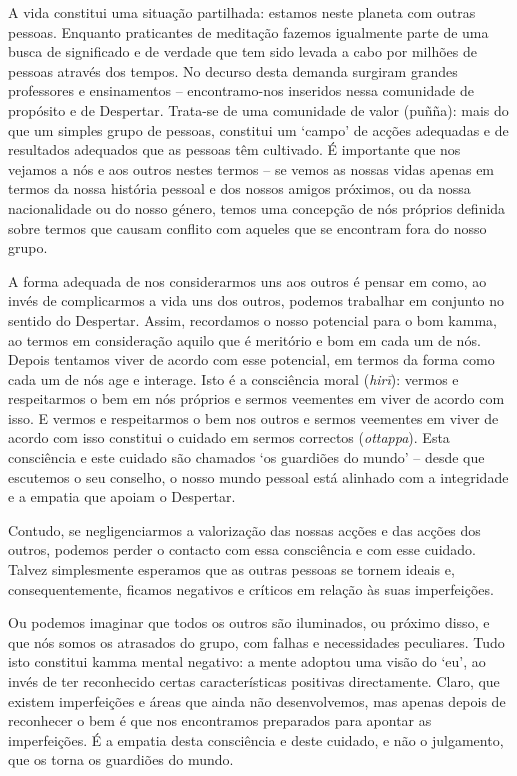 A vida constitui uma situação partilhada: estamos neste planeta com outras pessoas. Enquanto praticantes de meditação fazemos igualmente parte de uma busca de significado e de verdade que tem sido levada a cabo por milhões de pessoas através dos tempos. No decurso desta demanda surgiram grandes professores e ensinamentos -- encontramo-nos inseridos nessa comunidade de propósito e de Despertar. Trata-se de uma comunidade de valor (puñña): mais do que um simples grupo de pessoas, constitui um `campo' de acções adequadas e de resultados adequados que as pessoas têm cultivado. É importante que nos vejamos a nós e aos outros nestes termos -- se vemos as nossas vidas apenas em termos da nossa história pessoal e dos nossos amigos próximos, ou da nossa nacionalidade ou do nosso género, temos uma concepção de nós próprios definida sobre termos que causam conflito com aqueles que se encontram fora do nosso grupo.

A forma adequada de nos considerarmos uns aos outros é pensar em como, ao invés de complicarmos a vida uns dos outros, podemos trabalhar em conjunto no sentido do Despertar. Assim, recordamos o nosso potencial para o bom kamma, ao termos em consideração aquilo que é meritório e bom em cada um de nós. Depois tentamos viver de acordo com esse potencial, em termos da forma como cada um de nós age e interage. Isto é a consciência moral (\emph{hirī}): vermos e respeitarmos o bem em nós próprios e sermos veementes em viver de acordo com isso. E vermos e respeitarmos o bem nos outros e sermos veementes em viver de acordo com isso constitui o cuidado em sermos correctos (\emph{ottappa}). Esta consciência e este cuidado são chamados `os guardiões do mundo' -- desde que escutemos o seu conselho, o nosso mundo pessoal está alinhado com a integridade e a empatia que apoiam o Despertar.

Contudo, se negligenciarmos a valorização das nossas acções e das acções dos outros, podemos perder o contacto com essa consciência e com esse cuidado. Talvez simplesmente esperamos que as outras pessoas se tornem ideais e, consequentemente, ficamos negativos e críticos em relação às suas imperfeições.

Ou podemos imaginar que todos os outros são iluminados, ou próximo disso, e que nós somos os atrasados do grupo, com falhas e necessidades peculiares. Tudo isto constitui kamma mental negativo: a mente adoptou uma visão do `eu', ao invés de ter reconhecido certas características positivas directamente. Claro, que existem imperfeições e áreas que ainda não desenvolvemos, mas apenas depois de reconhecer o bem é que nos encontramos preparados para apontar as imperfeições. É a empatia desta consciência e deste cuidado, e não o julgamento, que os torna os guardiões do mundo.

